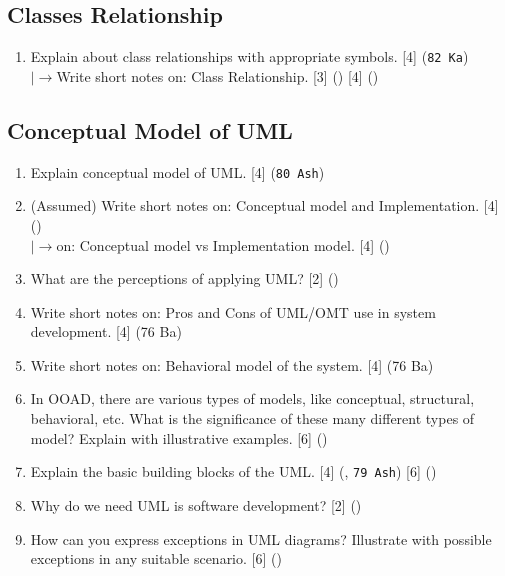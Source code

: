\documentclass[12pt]{article}
\newcommand{\lb}{\\$\left|\rightarrow\right.$}
\begin{document}
  \subsection{Classes Relationship}
    \begin{enumerate}
      \item Explain about class relationships with appropriate symbols. \hfill [4] (\texttt{82 Ka})
      \lb Write short notes on: Class Relationship. \hfill [3] () [4] ()
    \end{enumerate}

  \subsection{Conceptual Model of UML}
    \begin{enumerate}
      \item Explain conceptual model of UML. \hfill [4] (\texttt{80 Ash})

      \item (Assumed) Write short notes on: Conceptual model and Implementation. \hfill [4] ()
        \lb on: Conceptual model vs Implementation model. \hfill [4] ()

      \item What are the perceptions of applying UML? \hfill [2] ()

      \item Write short notes on: Pros and Cons of UML/OMT use in system development. \hfill [4] (76 Ba)

      \item Write short notes on: Behavioral model of the system. \hfill [4] (76 Ba)

      \item In OOAD, there are various types of models, like conceptual, structural, behavioral, etc. What is the significance of these many different types of model? Explain with illustrative examples. \hfill [6] ()

      \item Explain the basic building blocks of the UML. \hfill [4] (, \texttt{79 Ash}) [6] ()

      \item Why do we need UML is software development? \hfill [2] ()

      \item How can you express exceptions in UML diagrams? Illustrate with possible exceptions in any suitable scenario. \hfill [6] ()


\end{enumerate}
\end{document}
